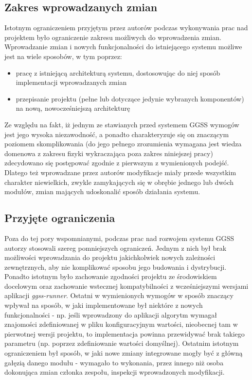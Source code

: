 \subsection{Zakres wprowadzanych zmian} %
Istotnym ograniczeniem przyjętym przez autorów podczas wykonywania prac nad projektem było ograniczenie zakresu możliwych do wprowadzenia zmian. Wprowadzanie zmian i nowych funkcjonalności do istniejącego systemu możliwe jest na wiele sposobów, w tym poprzez: 
\begin{itemize}
    \item pracę z istniejącą architekturą systemu, dostosowując do niej sposób implementacji wprowadzanych zmian
    \item przepisanie projektu (pełne lub dotyczące jedynie wybranych komponentów) na nową, nowocześniejszą architekturę
\end{itemize}
Ze względu na fakt, iż jednym ze stawianych przed systemem GGSS wymogów jest jego wysoka niezawodność, a ponadto charakteryzuje się on znaczącym poziomem skomplikowania (do jego pełnego zrozumienia wymagana jest wiedza domenowa z zakresu fizyki wykraczająca poza zakres niniejszej pracy) zdecydowano się postępować zgodnie z pierwszym z wymienionych podejść. Dlatego też wprowadzane przez autorów modyfikacje miały przede wszystkim charakter niewielkich, zwykle zamykających się w obrębie jednego lub dwóch modułów, zmian mających udoskonalić sposób działania systemu. 

\subsection{Przyjęte ograniczenia}
Poza do tej pory wspomnianymi, podczas prac nad rozwojem systemu GGSS autorzy stosowali szereg pomniejszych ograniczeń. Jednym z nich był brak możliwości wprowadzania do projektu jakichkolwiek nowych zależności zewnętrznych, aby nie komplikować sposobu jego budowania i dystrybucji. Ponadto istotnym było zachowanie zgodności projektu ze środowiskiem docelowym oraz zachowanie wstecznej kompatybilności z wcześniejszymi wersjami aplikacji \emph{ggss-runner}. Ostatni w wymienionych wymogów w sposób znaczący wpływał na sposób, w jaki implementowane był niektóre z nowych funkcjonalności - np. jeśli wprowadzony do aplikacji algorytm wymagał znajomości zdefiniowanej w pliku konfiguracyjnym wartości, nieobecnej tam w pierwotnej wersji projektu, to implementacja powinna przewidywać brak takiego parametru (np. poprzez zdefiniowanie wartości domyślnej). Ostatnim istotnym ograniczeniem był sposób, w jaki nowe zmiany integrowane mogły być z główną gałęzią danego modułu - wymagało to wykonania, przez innego niż osoba dokonująca zmian członka zespołu, inspekcji wprowadzonych modyfikacji.


